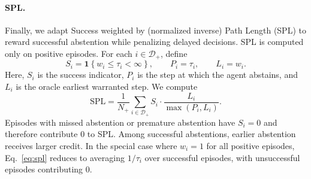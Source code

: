 \documentclass{llmxive}
\providecommand{\ind}[1]{\mathbf{1}\!\left\{#1\right\}}
\begin{document}

\paragraph{SPL.}
Finally, we adapt Success weighted by (normalized inverse) Path Length (SPL) \cite{anderson2018evaluation} to reward successful abstention while penalizing delayed decisions. SPL is computed only on positive episodes. For each $i\in\mathcal{D}_{+}$, define
\begin{equation}
S_i = \ind{w_i \le \tau_i < \infty},
\qquad
P_i = \tau_i,
\qquad
L_i = w_i.
\label{eq:spl_terms}
\end{equation}
Here, $S_i$ is the success indicator, $P_i$ is the step at which the agent abstains, and $L_i$ is the oracle earliest warranted step. We compute
\begin{equation}
\mathrm{SPL}
=
\frac{1}{N_{+}}
\sum_{i \in \mathcal{D}_{+}}
S_i \cdot \frac{L_i}{\max(P_i,L_i)}.
\label{eq:spl}
\end{equation}
Episodes with missed abstention or premature abstention have $S_i=0$ and therefore contribute $0$ to SPL. Among successful abstentions, earlier abstention receives larger credit. In the special case where $w_i=1$ for all positive episodes, Eq.~\eqref{eq:spl} reduces to averaging $1/\tau_i$ over successful episodes, with unsuccessful episodes contributing $0$.
\end{document}
